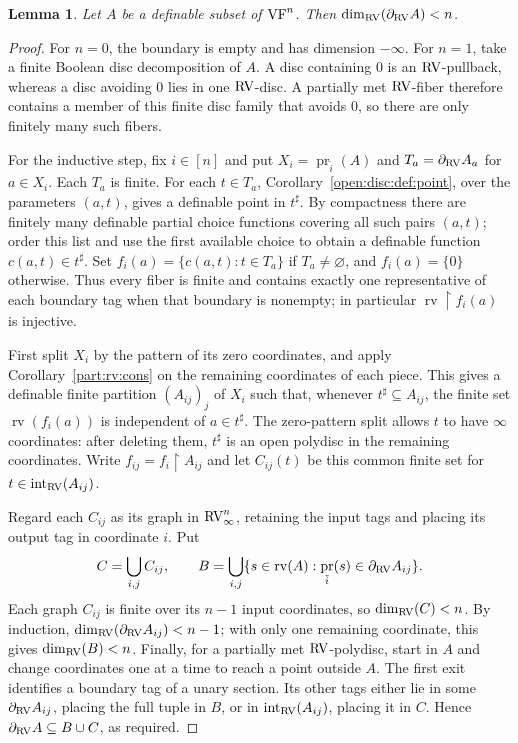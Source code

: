 \documentclass[12pt]{amsart}
\theoremstyle{plain}
\newtheorem{lem}[thm]{Lemma}
\theoremstyle{definition}
\theoremstyle{remark}
\numberwithin{equation}{section}
\theoremstyle{plain}
\newcommand{\VF}{\textup{VF}}
\newcommand{\RV}{\textup{RV}}
\DeclareMathOperator{\pr}{pr}
\newcommand{\0}{\emptyset}
\newcommand{\rest}{\upharpoonright}
\newcommand{\sub}{\subseteq}
\DeclareMathOperator{\rv}{rv}
\DeclareMathOperator{\ito}{int}
\begin{document}
\begin{lem}\label{RV:bou:dim}
Let $A$ be a definable subset of $\VF^n$. Then $\dim_{\RV}(\partial_{\RV} A) < n$.
\end{lem}
\begin{proof}
For $n=0$, the boundary is empty and has dimension $-\infty$. For $n=1$, take a finite Boolean disc decomposition of $A$. A disc containing $0$ is an $\RV$-pullback, whereas a disc avoiding $0$ lies in one $\RV$-disc. A partially met $\RV$-fiber therefore contains a member of this finite disc family that avoids $0$, so there are only finitely many such fibers.

For the inductive step, fix $i\in[n]$ and put $X_i=\pr_{\tilde i}(A)$ and $T_a=\partial_{\RV}A_a$ for $a\in X_i$. Each $T_a$ is finite. For each $t\in T_a$, Corollary~\ref{open:disc:def:point}, over the parameters $(a,t)$, gives a definable point in $t^\sharp$. By compactness there are finitely many definable partial choice functions covering all such pairs $(a,t)$; order this list and use the first available choice to obtain a definable function $c(a,t)\in t^\sharp$. Set $f_i(a)=\{c(a,t):t\in T_a\}$ if $T_a\ne\varnothing$, and $f_i(a)=\{0\}$ otherwise. Thus every fiber is finite and contains exactly one representative of each boundary tag when that boundary is nonempty; in particular $\rv\rest f_i(a)$ is injective.

First split $X_i$ by the pattern of its zero coordinates, and apply Corollary~\ref{part:rv:cons} on the remaining coordinates of each piece. This gives a definable finite partition $(A_{ij})_j$ of $X_i$ such that, whenever $t^\sharp\sub A_{ij}$, the finite set $\rv(f_i(a))$ is independent of $a\in t^\sharp$. The zero-pattern split allows $t$ to have $\infty$ coordinates: after deleting them, $t^\sharp$ is an open polydisc in the remaining coordinates. Write $f_{ij}=f_i\rest A_{ij}$ and let $C_{ij}(t)$ be this common finite set for $t\in\ito_{\RV}(A_{ij})$.

Regard each $C_{ij}$ as its graph in $\RV_\infty^n$, retaining the input tags and placing its output tag in coordinate $i$. Put
\[
 C=\bigcup_{i,j}C_{ij},\qquad
 B=\bigcup_{i,j}\{s\in\rv(A):\pr_{\tilde i}(s)\in\partial_{\RV}A_{ij}\}.
\]
Each graph $C_{ij}$ is finite over its $n-1$ input coordinates, so $\dim_{\RV}(C)<n$. By induction, $\dim_{\RV}(\partial_{\RV}A_{ij})<n-1$; with only one remaining coordinate, this gives $\dim_{\RV}(B)<n$. Finally, for a partially met $\RV$-polydisc, start in $A$ and change coordinates one at a time to reach a point outside $A$. The first exit identifies a boundary tag of a unary section. Its other tags either lie in some $\partial_{\RV}A_{ij}$, placing the full tuple in $B$, or in $\ito_{\RV}(A_{ij})$, placing it in $C$. Hence $\partial_{\RV}A\sub B\cup C$, as required.
\end{proof}
\end{document}
